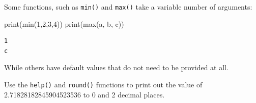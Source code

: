 \documentclass[
  letterpaper,
  DIV=11,
  numbers=noendperiod]{scrreprt}
\newenvironment{Shaded}{\begin{snugshade}}{\end{snugshade}}
\newcommand{\BuiltInTok}[1]{\textcolor[rgb]{0.00,0.23,0.31}{#1}}
\newcommand{\DecValTok}[1]{\textcolor[rgb]{0.68,0.00,0.00}{#1}}
\newcommand{\NormalTok}[1]{\textcolor[rgb]{0.00,0.23,0.31}{#1}}
\newcommand{\StringTok}[1]{\textcolor[rgb]{0.13,0.47,0.30}{#1}}
\begin{document}
Some functions, such as \texttt{min()} and \texttt{max()} take a
variable number of arguments:

\begin{Shaded}
\begin{Highlighting}[]
 \BuiltInTok{print}\NormalTok{(}\BuiltInTok{min}\NormalTok{(}\DecValTok{1}\NormalTok{,}\DecValTok{2}\NormalTok{,}\DecValTok{3}\NormalTok{,}\DecValTok{4}\NormalTok{))}
 \BuiltInTok{print}\NormalTok{(}\BuiltInTok{max}\NormalTok{(}\StringTok{\textquotesingle{}a\textquotesingle{}}\NormalTok{, }\StringTok{\textquotesingle{}b\textquotesingle{}}\NormalTok{, }\StringTok{\textquotesingle{}c\textquotesingle{}}\NormalTok{))}
\end{Highlighting}
\end{Shaded}

\begin{verbatim}
1
c
\end{verbatim}

While others have default values that do not need to be provided at all.

\begin{tcolorbox}[enhanced jigsaw, rightrule=.15mm, opacitybacktitle=0.6, colback=white, toprule=.15mm, colframe=quarto-callout-warning-color-frame, bottomtitle=1mm, bottomrule=.15mm, arc=.35mm, coltitle=black, breakable, title={Challenge 4}, titlerule=0mm, opacityback=0, colbacktitle=quarto-callout-warning-color!10!white, left=2mm, toptitle=1mm, leftrule=.75mm]
Use the \texttt{help()} and \texttt{round()} functions to print out the
value of 2.71828182845904523536 to 0 and 2 decimal places.
\end{tcolorbox}
\end{document}
